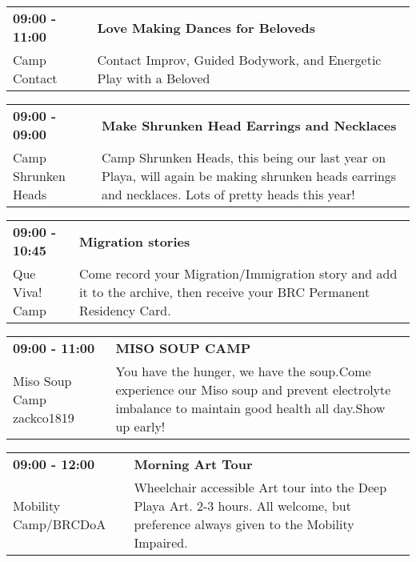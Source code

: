 \begin{tabular}{ p{1in} p{2.2in} }
    \textbf{09:00 - 11:00} & \textbf{Love Making Dances for Beloveds} \\
    Camp Contact \newline  & Contact Improv, Guided Bodywork, and Energetic Play with a Beloved \\
    \hline 
\end{tabular}
    
\begin{tabular}{ p{1in} p{2.2in} }
    \textbf{09:00 - 09:00} & \textbf{Make Shrunken Head Earrings and Necklaces} \\
    Camp Shrunken Heads \newline  & Camp Shrunken Heads, this being our last year on Playa, will again be making shrunken heads earrings and necklaces. Lots of pretty heads this year! \\
    \hline 
\end{tabular}
    
\begin{tabular}{ p{1in} p{2.2in} }
    \textbf{09:00 - 10:45} & \textbf{Migration stories} \\
    Que Viva! Camp \newline  & Come record your Migration/Immigration story and add it to the archive, then receive your BRC Permanent Residency Card. \\
    \hline 
\end{tabular}
    
\begin{tabular}{ p{1in} p{2.2in} }
    \textbf{09:00 - 11:00} & \textbf{MISO SOUP CAMP } \\
    Miso Soup Camp \newline zackco1819 & You have the hunger, we have the soup.Come experience our Miso soup and prevent electrolyte imbalance to maintain good health all day.Show up early! \\
    \hline 
\end{tabular}
    
\begin{tabular}{ p{1in} p{2.2in} }
    \textbf{09:00 - 12:00} & \textbf{Morning Art Tour} \\
    Mobility Camp/BRCDoA \newline  & Wheelchair accessible Art tour into the Deep Playa Art.
2-3 hours. All welcome, but preference always given to the Mobility Impaired. \\
    \hline 
\end{tabular}
    

